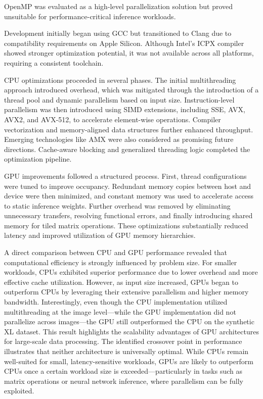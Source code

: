 \documentclass[modern,longauthor]{aastex7}
\begin{document}
OpenMP was evaluated as a high-level parallelization solution but proved unsuitable for performance-critical inference workloads.

Development initially began using GCC but transitioned to Clang due to compatibility requirements on Apple Silicon. Although Intel’s ICPX compiler showed stronger optimization potential, it was not available across all platforms, requiring a consistent toolchain.

CPU optimizations proceeded in several phases. The initial multithreading approach introduced overhead, which was mitigated through the introduction of a thread pool and dynamic parallelism based on input size. Instruction-level parallelism was then introduced using SIMD extensions, including SSE, AVX, AVX2, and AVX-512, to accelerate element-wise operations. Compiler vectorization and memory-aligned data structures further enhanced throughput. Emerging technologies like AMX were also considered as promising future directions. Cache-aware blocking and generalized threading logic completed the optimization pipeline.

GPU improvements followed a structured process. First, thread configurations were tuned to improve occupancy. Redundant memory copies between host and device were then minimized, and constant memory was used to accelerate access to static inference weights. Further overhead was removed by eliminating unnecessary transfers, resolving functional errors, and finally introducing shared memory for tiled matrix operations. These optimizations substantially reduced latency and improved utilization of GPU memory hierarchies.

A direct comparison between CPU and GPU performance revealed that computational efficiency is strongly influenced by problem size. For smaller workloads, CPUs exhibited superior performance due to lower overhead and more effective cache utilization. However, as input size increased, GPUs began to outperform CPUs by leveraging their extensive parallelism and higher memory bandwidth. Interestingly, even though the CPU implementation utilized multithreading at the image level—while the GPU implementation did not parallelize across images—the GPU still outperformed the CPU on the synthetic XL dataset. This result highlights the scalability advantages of GPU architectures for large-scale data processing. The identified crossover point in performance illustrates that neither architecture is universally optimal. While CPUs remain well-suited for small, latency-sensitive workloads, GPUs are likely to outperform CPUs once a certain workload size is exceeded—particularly in tasks such as matrix operations or neural network inference, where parallelism can be fully exploited.
\end{document}
